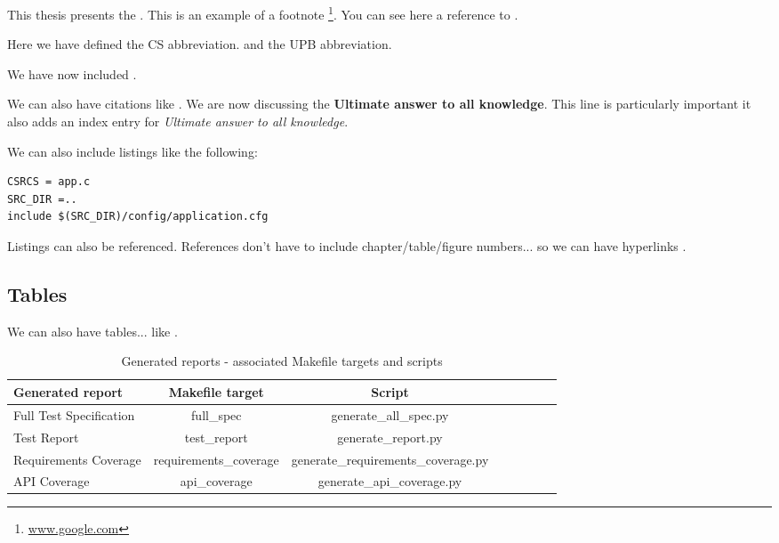 This thesis presents the \textbf{\project}.
This is an example of a footnote \footnote{\url{www.google.com}}. 
You can see here a reference to .

Here we have defined the CS abbreviation. and the UPB abbreviation.

We have now included .


We can also have citations like \cite{iso-odf}.
We are now discussing the \textbf{Ultimate answer to all knowledge}.
This line is particularly important it also adds an index entry for \textit{Ultimate answer to all knowledge}.



We can also include listings like the following:

\lstset{language=make,caption=Application Makefile,label=lst:app-make}
\begin{lstlisting}
CSRCS = app.c
SRC_DIR =..
include $(SRC_DIR)/config/application.cfg
\end{lstlisting}

Listings can also be referenced. References don't have to include chapter/table/figure numbers... so we can have hyperlinks .

\subsection{Tables}

We can also have tables... like .

\begin{center}
	\begin{table}[htb]
		\caption{Generated reports - associated Makefile targets and scripts}
		\begin{tabular}{l*{6}{c}r}
			Generated report & Makefile target & Script \\
			\hline
			Full Test Specification & full_spec & generate_all_spec.py  \\
			Test Report & test_report & generate_report.py  \\
			Requirements Coverage & requirements_coverage &
			generate_requirements_coverage.py   \\
			API Coverage & api_coverage & generate_api_coverage.py  \\
		\end{tabular}
		\label{table:reports}
	\end{table}
\end{center}
